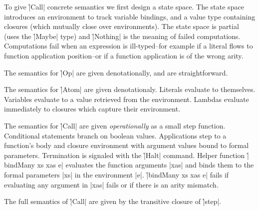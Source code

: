 To give \h|Call| concrete semantics we first design a state space.
%
The state space introduces an environment to track variable bindings, and a
value type containing closures (which mutually close over environments).
%
%
The state space is partial (uses the \h|Maybe| type) and \h|Nothing| is the meaning
of failed computations.
%
Computations fail when an expression is ill-typed--for example if a literal
flows to function application position--or if a function application is of the
wrong arity.


The semantics for \h|Op| are given denotationally, and are straightforward.
%


The semantics for \h|Atom| are given denotationaly.
%
%
Literals evaluate to themselves.
%
Variables evaluate to a value retrieved from the environment.
%
Lambdas evaluate immediately to closures which capture their environment.


The semantics for \h|Call| are given \textit{operationally} as a small step
function.
%
%
Conditional statements branch on boolean values.
%
Applications step to a function's body and closure environment with argument
values bound to formal parameters.
%
Termination is signaled with the \h|Halt| command.
%
Helper function \h|bindMany xs xas e| evaluates the function arguments \p|xas| and
binds them to the formal parameters \p|xs| in the environment \p|e|.
%
%
\h|bindMany xs xas e| fails if evaluating any argument in \p|xas| fails or if
there is an arity mismatch.


The full semantics of \h|Call| are given by the transitive closure of \h|step|.
%
